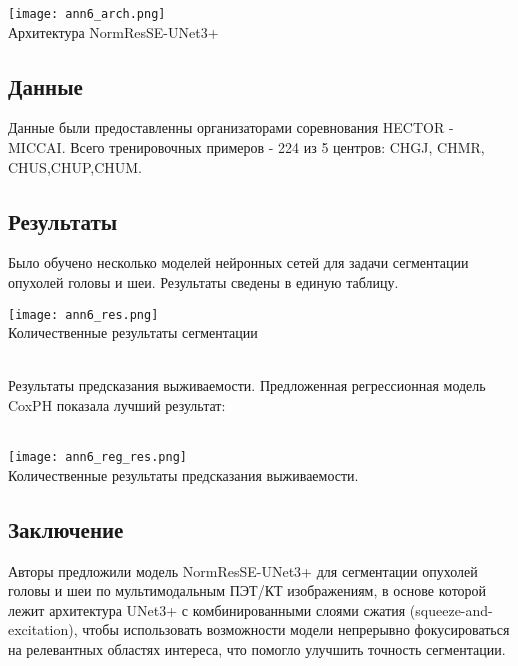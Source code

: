     \begin{minipage}{1.0\linewidth}
        \begin{center} 
        \texttt{[image: ann6\_arch.png]}\\
        \caption{\scriptsize{Архитектура NormResSE-UNet3+}}
        
     \end{center}

    \end{minipage}

\subsection*{Данные}
Данные были предоставленны организаторами соревнования HECTOR - MICCAI. Всего 
тренировочных примеров - 224 из 5 центров: CHGJ, CHMR, CHUS,CHUP,CHUM.

\subsection*{Результаты}
Было обучено несколько моделей нейронных сетей для задачи сегментации опухолей головы и шеи. 
Результаты сведены в единую таблицу.
\begin{minipage}{1.0\linewidth}
    \begin{center}
        
    
    \texttt{[image: ann6\_res.png]}\\
    \caption{\scriptsize{Количественные результаты сегментации}}
\end{center}
\end{minipage}
\\

Результаты предсказания выживаемости. Предложенная регрессионная модель CoxPH показала 
лучший результат: \\
\\
\begin{minipage}{1.0\linewidth}
    \begin{center}
        
   
    \texttt{[image: ann6\_reg\_res.png]}\\
    \caption{\scriptsize{Количественные результаты предсказания выживаемости.}}
\end{center}
\end{minipage}


\subsection*{Заключение}
Авторы предложили модель NormResSE-UNet3+ для сегментации опухолей головы и шеи по мультимодальным 
ПЭТ/КТ изображениям, в основе которой лежит архитектура UNet3+ с комбинированными слоями 
сжатия (squeeze-and-excitation), чтобы использовать возможности модели непрерывно фокусироваться 
на релевантных областях интереса, что помогло улучшить точность сегментации.
